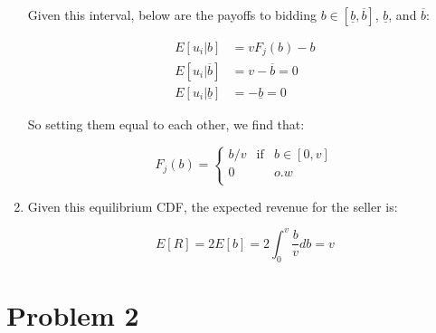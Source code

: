 \documentclass[11pt,english]{article}
\begin{document}
\begin{enumerate}
Given this interval, below are the payoffs to bidding $b\in{[\underline{b},\overline{b}]}$, $\underline{b}$, and $\overline{b}$:

\begin{align}
E[u_{i}|b]&=vF_{j}(b)-b\nonumber\\
E[u_{i}|\overline{b}]&=v-\overline{b}=0\nonumber\\
E[u_{i}|\underline{b}]&=-\underline{b}=0\nonumber
\end{align}

So setting them equal to each other, we find that:

\begin{equation}
F_{j}(b)=\left\{
\begin{array}{ccc}
b/v& \mbox{if}& b\in[0,v]\\
0 & & o.w\\
\end{array}\right.
\end{equation}

\item Given this equilibrium CDF, the expected revenue for the seller is:

\begin{equation}
\nonumber
E[R]=2E[b]=2\int_{0}^{v} \frac{b}{v}db=v
\end{equation}
\end{enumerate}

\section{Problem 2}
\end{document}
